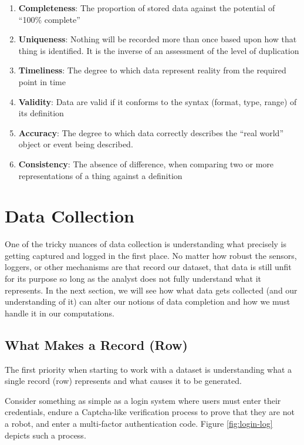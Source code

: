 \documentclass[
]{krantz}
\providecommand{\tightlist}{%
  \setlength{\itemsep}{0pt}\setlength{\parskip}{0pt}}
\begin{document}
\begin{enumerate}
\def\labelenumi{\arabic{enumi}.}
\tightlist
\item
  \textbf{Completeness}: The proportion of stored data against the potential of ``100\% complete''
\item
  \textbf{Uniqueness}: Nothing will be recorded more than once based upon how that thing is identified. It is the inverse of an assessment of the level of duplication
\item
  \textbf{Timeliness}: The degree to which data represent reality from the required point in time
\item
  \textbf{Validity}: Data are valid if it conforms to the syntax (format, type, range) of its definition
\item
  \textbf{Accuracy}: The degree to which data correctly describes the ``real world'' object or event
  being described.
\item
  \textbf{Consistency}: The absence of difference, when comparing two or more representations of a
  thing against a definition
\end{enumerate}

\hypertarget{data-collection}{%
\section{Data Collection}\label{data-collection}}

One of the tricky nuances of data collection is understanding what precisely is getting captured and logged in the first place.
No matter how robust the sensors, loggers, or other mechanisms are that record our dataset, that data is still unfit for its purpose so long as the analyst does not fully understand what it represents.
In the next section, we will see how what data gets collected (and our understanding of it) can alter our notions of data completion and how we must handle it in our computations.

\hypertarget{what-makes-a-record-row}{%
\subsection{What Makes a Record (Row)}\label{what-makes-a-record-row}}

The first priority when starting to work with a dataset is understanding what a single record (row) represents and what causes it to be generated.

Consider something as simple as a login system where users must enter their credentials, endure a Captcha-like verification process to prove that they are not a robot, and enter a multi-factor authentication code. Figure \ref{fig:login-log} depicts such a process.
\end{document}
